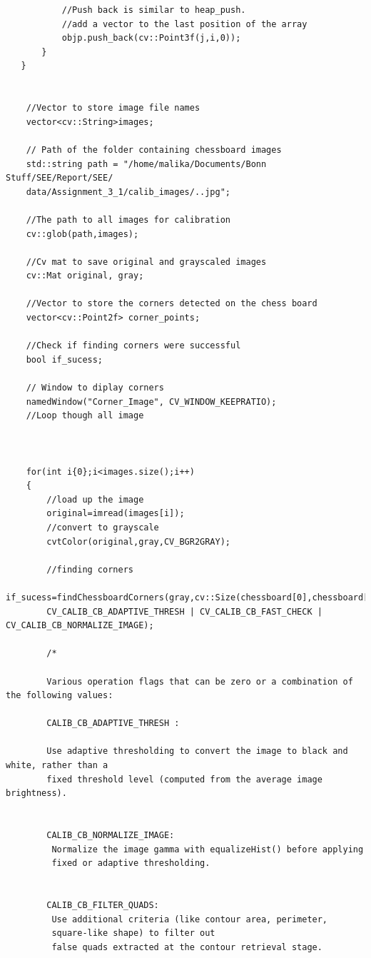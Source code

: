 \begin{verbatim}
           //Push back is similar to heap_push. 
           //add a vector to the last position of the array
           objp.push_back(cv::Point3f(j,i,0));
       }
   }


    //Vector to store image file names
    vector<cv::String>images;

    // Path of the folder containing chessboard images
    std::string path = "/home/malika/Documents/Bonn Stuff/SEE/Report/SEE/
    data/Assignment_3_1/calib_images/..jpg";

    //The path to all images for calibration
    cv::glob(path,images);

    //Cv mat to save original and grayscaled images
    cv::Mat original, gray;

    //Vector to store the corners detected on the chess board 
    vector<cv::Point2f> corner_points;

    //Check if finding corners were successful
    bool if_sucess;

    // Window to diplay corners
    namedWindow("Corner_Image", CV_WINDOW_KEEPRATIO);
    //Loop though all image

    

    for(int i{0};i<images.size();i++)
    {
        //load up the image
        original=imread(images[i]);
        //convert to grayscale
        cvtColor(original,gray,CV_BGR2GRAY);        

        //finding corners
        if_sucess=findChessboardCorners(gray,cv::Size(chessboard[0],chessboard[1]),corner_points, 
        CV_CALIB_CB_ADAPTIVE_THRESH | CV_CALIB_CB_FAST_CHECK | CV_CALIB_CB_NORMALIZE_IMAGE);
        
        /*

        Various operation flags that can be zero or a combination of the following values:

        CALIB_CB_ADAPTIVE_THRESH :

        Use adaptive thresholding to convert the image to black and white, rather than a 
        fixed threshold level (computed from the average image brightness).


        CALIB_CB_NORMALIZE_IMAGE:
         Normalize the image gamma with equalizeHist() before applying 
         fixed or adaptive thresholding.


        CALIB_CB_FILTER_QUADS:
         Use additional criteria (like contour area, perimeter, 
         square-like shape) to filter out 
         false quads extracted at the contour retrieval stage.


\end{verbatim}
